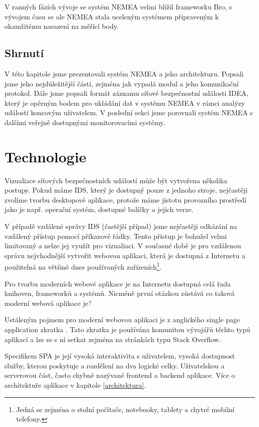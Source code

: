 V ranných fázích vývoje se systém NEMEA velmi blížil frameworku Bro, s vývojem času se ale NEMEA stala uceleným systémem připraveným k okamžitému nasazení na měřící body.

\section{Shrnutí}

V této kapitole jsme prezentovali systém NEMEA a jeho architekturu. Popsali jsme jeho nejdůležitější části, zejména jak vypadá modul a jeho komunikační protokol. Dále jsme popsali formát záznamu síťové bezpečnostní události IDEA, který je opěrným bodem pro ukládání dat v systému NEMEA v rámci analýzy událostí koncovým uživatelem. V poslední sekci jsme porovnali systém NEMEA s dalšími veřejně dostupnými monitorovacími systémy.


\chapter{Technologie}

Vizualiace síťových bezpečnostních událostí může být vytvořena několika postupy. Pokud máme IDS, který je dostupný pouze z jednoho stroje, nejčastěji zvolíme tvorbu desktopové aplikace, protože máme jistotu provozního prostředí jako je např. operační systém, dostupné balíčky a jejich verze. 

V případě vzdálené správy IDS (častější případ) jsme nejčastěji odkázání na vzdálený přístup pomocí příkazové řádky. Tento přístup je bohužel velmi limitovaný a nelze jej využít pro vizualiaci. V současné době je pro vzdálenou správu nejvhodnější vytvořit webovou aplikaci, která je dostupná z Internetu a použitelná na většině dnes používaných zařízeních\footnote{Jedná se zejména o stolní počítače, notebooky, tablety a chytré mobilní telefony.}.

Pro tvorbu moderních webové aplikace je na Internetu dostupná celá řada knihoven, frameworků a systémů. Nicméně první otázkou zůstává co taková moderní webová aplikace je?

Ustáleným pojmem pro moderní webovou aplikaci je z anglického single page application\cite{spa} zkratka . Tato zkratka je používána komunitou vývojářů těchto typů aplikací a lze se s ní setkat zejména na stránkách typu Stack Overflow.

Specifikem SPA je její vysoká interaktivita s uživatelem, vysoká dostupnost služby, kterou poskytuje a rozdělení na dva logické celky. Uživatelskou a serverovou část, často chybně nazývané frontend a backend aplikace. Více o architektuře aplikace v kapitole \ref{architektura}.

